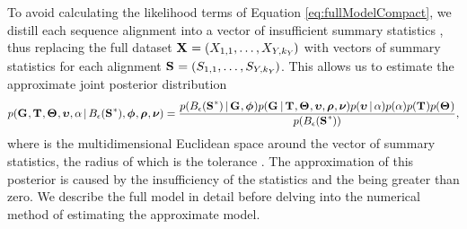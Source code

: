 \documentclass[letterpaper,12pt]{article}
\begin{document}
\begin{linenumbers}
\begin{linenomath}
To avoid calculating the likelihood terms of Equation \ref{eq:fullModelCompact},
we distill each sequence alignment \alignment{}{} into a vector of insufficient
summary statistics \alignmentSS{}{}, thus replacing the full dataset
$\alignmentVector = (\alignment{1}{1}, \ldots,
    \alignment{\npairs{}}{\nloci{\npairs{}}})$
with vectors of summary statistics for each alignment
$\ssVector{} = (\alignmentSS{1}{1}, \ldots,
    \alignmentSS{\npairs{}}{\nloci{\npairs{}}})$.
This allows us to estimate the approximate joint posterior distribution
{\small
\begin{equation}
    p(\geneTreeVector, \divTimeMapVector, \demographicParamVector, 
    \locusMutationRateScalarVector, \locusRateHetShapeParameter \given
    \ssSpace, \hkyModelVector, \ploidyScalarVector,
    \mutationRateScalarConstantVector) =
    \frac{p(\ssSpace \given \geneTreeVector, \hkyModelVector)
        p(\geneTreeVector \given \divTimeMapVector, \demographicParamVector,
        \locusMutationRateScalarVector, \ploidyScalarVector,
        \mutationRateScalarConstantVector)
        p(\locusMutationRateScalarVector \given \locusRateHetShapeParameter)
        p(\locusRateHetShapeParameter)
        p(\divTimeMapVector)
        p(\demographicParamVector)}{
        p(\ssSpace)},
    \label{eq:approxModelCompact}
\end{equation}
}
where \ssSpace is the multidimensional Euclidean space around the vector of
summary statistics, the radius of which is the tolerance \tol.
The approximation of this posterior is caused by the insufficiency of the
statistics and the \tol being greater than zero.
We describe the full model in detail before delving into the numerical
method of estimating the approximate model.
\end{linenomath}


\end{linenumbers}
\end{document}
